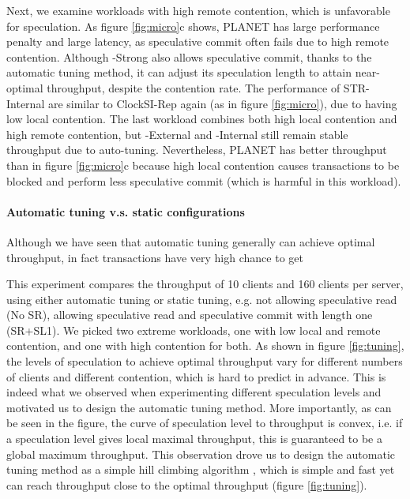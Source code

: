 Next, we examine workloads with high remote contention, which is unfavorable for speculation. As figure \ref{fig:micro}c shows, PLANET has large performance penalty and large latency, as speculative commit often fails due to high remote contention. Although {\specula}-Strong also allows speculative commit, thanks to the automatic tuning method, it can adjust its speculation length to attain near-optimal throughput, despite the contention rate. The performance of STR-Internal are similar to ClockSI-Rep again (as in figure \ref{fig:micro}), due to having low local contention. The last workload combines both high local contention and high remote contention, but {\specula}-External and {\specula}-Internal still remain stable throughput due to auto-tuning. Nevertheless, PLANET has better throughput than in figure \ref{fig:micro}c because high local contention causes transactions to be blocked and perform less speculative commit (which is harmful in this workload).

\paragraph{Automatic tuning v.s. static configurations} Although we have seen that automatic tuning generally can achieve optimal throughput, in fact transactions have very high chance to get 


This experiment compares the throughput of 10 clients and 160 clients per server, using either automatic tuning or static tuning, e.g. not allowing speculative read (No SR), allowing speculative read and speculative commit with length one (SR+SL1). We picked two extreme workloads, one with low local and remote contention, and one with high contention for both. As shown in figure \ref{fig:tuning}, the levels of speculation to achieve optimal throughput vary for different numbers of clients and different contention, which is hard to predict in advance. This is indeed what we observed when experimenting different speculation levels and motivated us to design the automatic tuning method. More importantly, as can be seen in the figure, the curve of speculation level to throughput is convex, i.e. if a speculation level gives local maximal throughput, this is guaranteed to be a global maximum throughput. This observation drove us to design the automatic tuning method as a simple hill climbing algorithm \cite{hillclimbing}, which is simple and fast yet can reach throughput close to the optimal throughput (figure \ref{fig:tuning}).



